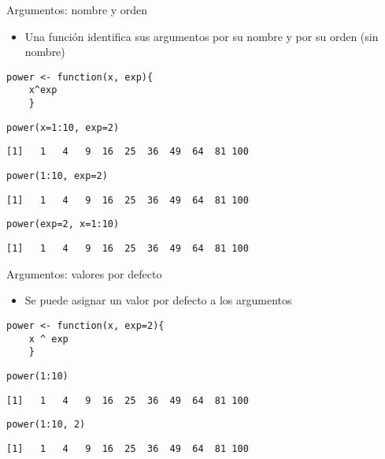\documentclass[xcolor={usenames,svgnames,dvipsnames}]{beamer}
\begin{document}
\begin{frame}[fragile,label=sec-1-5]{Argumentos: nombre y orden}
 \begin{itemize}
\item Una función identifica sus argumentos por su nombre y por su orden (sin nombre)
\end{itemize}

\lstset{language=R,numbers=none}
\begin{lstlisting}
power <- function(x, exp){
    x^exp
    }
\end{lstlisting}

\lstset{language=R,numbers=none}
\begin{lstlisting}
power(x=1:10, exp=2)
\end{lstlisting}

\begin{verbatim}
[1]   1   4   9  16  25  36  49  64  81 100
\end{verbatim}

\lstset{language=R,numbers=none}
\begin{lstlisting}
power(1:10, exp=2)
\end{lstlisting}

\begin{verbatim}
[1]   1   4   9  16  25  36  49  64  81 100
\end{verbatim}

\lstset{language=R,numbers=none}
\begin{lstlisting}
power(exp=2, x=1:10)
\end{lstlisting}

\begin{verbatim}
[1]   1   4   9  16  25  36  49  64  81 100
\end{verbatim}
\end{frame}
\begin{frame}[fragile,label=sec-1-6]{Argumentos: valores por defecto}
 \begin{itemize}
\item Se puede asignar un valor por defecto a los argumentos
\end{itemize}
\lstset{language=R,numbers=none}
\begin{lstlisting}
power <- function(x, exp=2){
    x ^ exp
    }
\end{lstlisting}

\lstset{language=R,numbers=none}
\begin{lstlisting}
power(1:10)
\end{lstlisting}

\begin{verbatim}
[1]   1   4   9  16  25  36  49  64  81 100
\end{verbatim}

\lstset{language=R,numbers=none}
\begin{lstlisting}
power(1:10, 2)
\end{lstlisting}

\begin{verbatim}
[1]   1   4   9  16  25  36  49  64  81 100
\end{verbatim}
\end{frame}
\end{document}
